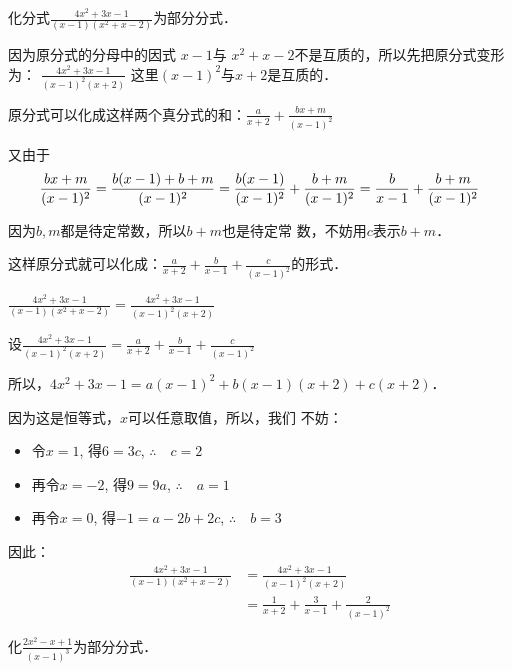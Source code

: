 \begin{example}
    化分式$\frac{4x^2+3x-1}{(x-1)(x^2+x-2)}$为部分分式．
\end{example}

\begin{analyze}
    因为原分式的分母中的因式
    $x-1$与
    $x^2+x-2$不是互质的，所以先把原分式变形为：
    $\frac{4x^2+3x-1}{(x-1)^2(x+2)}$
    这里$(x-1)^2$与$x+2$是互质的．
    
    原分式可以化成这样两个真分式的和：$\frac{a}{x+2}+\frac{bx+m}{(x-1)^2}$

    又由于
\[
    \frac{bx+m}{(x-1)^2}=\frac{b(x-1)+b+m}{(x-1)^2}\\
    =\frac{b(x-1)}{(x-1)^2}+\frac{b+m}{(x-1)^2}\\
    =\frac{b}{x-1}+\frac{b+m}{(x-1)^2}
\]

因为$b,m$都是待定常数，所以$b+m$也是待定常
数，不妨用$c$表示$b+m$．

这样原分式就可以化成：$\frac{a}{x+2}+\frac{b}{x-1}+\frac{c}{(x-1)^2}$的形式．
\end{analyze}

\begin{solution}
$\frac{4x^2+3x-1}{(x-1)(x^2+x-2)}=\frac{4x^2+3x-1}{(x-1)^2(x+2)}$

设$\frac{4x^2+3x-1}{(x-1)^2(x+2)}=\frac{a}{x+2}+\frac{b}{x-1}+\frac{c}{(x-1)^2}$

所以，$4x^2+3x-1=a(x-1)^2+b(x-1)(x+2)+c(x+2)$．

因为这是恒等式，$x$可以任意取值，所以，我们
不妨：
\begin{itemize}
    \item 令$x=1$, 得$6=3c$, \qquad$\therefore\quad c=2$
    \item 再令$x=-2$, 得$9=9a$, \qquad$\therefore\quad a=1$
\item 再令$x=0$, 得$-1=a-2b+2c$, \qquad$\therefore\quad b=3$
\end{itemize}
因此：
\[\begin{split}
    \frac{4x^2+3x-1}{(x-1)(x^2+x-2)}&=\frac{4x^2+3x-1}{(x-1)^2(x+2)}\\
    &= \frac{1}{x+2}+\frac{3}{x-1}+\frac{2}{(x-1)^2}
\end{split}\]
\end{solution}

\begin{example}
    化$\frac{2x^2-x+1}{(x-1)^3}$为部分分式．
\end{example}

